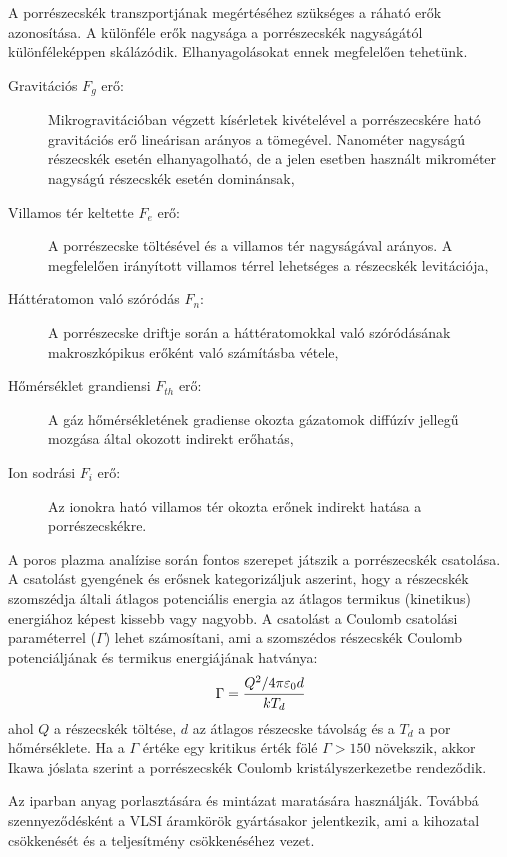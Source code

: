 	A porrészecskék transzportjának megértéséhez szükséges a ráható erők azonosítása.
	A különféle erők nagysága a porrészecskék nagyságától különféleképpen skálázódik. Elhanyagolásokat
	ennek megfelelően tehetünk.
	\begin{description}
		\item[Gravitációs $F_g$ erő:] Mikrogravitációban végzett kísérletek kivételével a porrészecskére
			ható gravitációs erő lineárisan arányos a tömegével. Nanométer nagyságú részecskék esetén
			elhanyagolható, de a jelen esetben használt mikrométer nagyságú részecskék esetén dominánsak,
		\item[Villamos tér keltette $F_e$ erő:] A porrészecske töltésével és a villamos tér nagyságával
			arányos. A megfelelően irányított villamos térrel lehetséges a részecskék levitációja,  
		\item[Háttératomon való szóródás $F_n$:] A porrészecske driftje során a háttératomokkal való
			szóródásának makroszkópikus erőként való számításba vétele,
		\item[Hőmérséklet grandiensi $F_{th}$ erő:] A gáz hőmérsékletének gradiense okozta
			gázatomok diffúzív jellegű mozgása által okozott indirekt erőhatás,
		\item[Ion sodrási $F_i$ erő:] Az ionokra ható villamos tér okozta erőnek indirekt hatása a
			porrészecskékre.
	\end{description}
	A poros plazma analízise során fontos szerepet játszik a porrészecskék csatolása.
	A csatolást gyengének és erősnek kategorizáljuk aszerint, hogy a részecskék szomszédja általi
	átlagos potenciális energia az átlagos termikus (kinetikus) energiához képest kissebb vagy nagyobb.
	A csatolást a Coulomb csatolási paraméterrel ($\Gamma$) lehet számosítani, ami a szomszédos
	részecskék Coulomb potenciáljának és termikus energiájának hatványa:
	\begin{equation}
		\Gamma = \cfrac{Q^2 / 4\pi\varepsilon_0 d}{kT_d} 
	\end{equation}
	ahol $Q$ a részecskék töltése, $d$ az átlagos részecske távolság és a $T_d$ a por hőmérséklete.
	Ha a $\Gamma$ értéke egy kritikus érték fölé $\Gamma > 150$ növekszik, akkor
	Ikawa jóslata szerint a porrészecskék Coulomb kristályszerkezetbe rendeződik.
	
	Az iparban anyag porlasztására és mintázat maratására használják. Továbbá szennyeződésként a VLSI
	áramkörök gyártásakor jelentkezik, ami a kihozatal csökkenését és a teljesítmény csökkenéséhez
	vezet.

